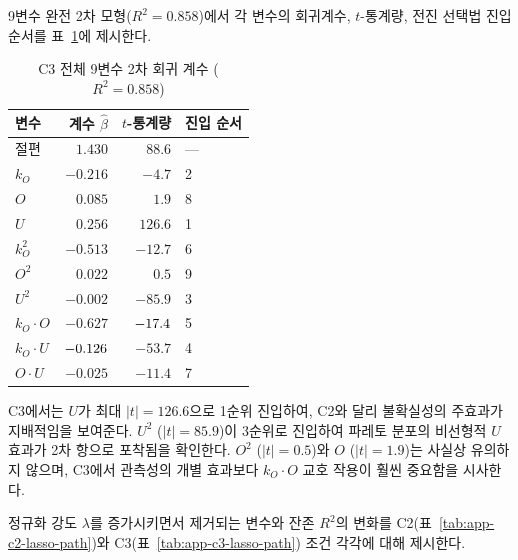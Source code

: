  9변수 완전 2차 모형($R^2 = 0.858$)에서 각 변수의 회귀계수,
$t$-통계량, 전진 선택법 진입 순서를 \p{[}표~\ref{tab:app-c3-full-quad}\p{]}에 제시한다.

\begin{table}[htbp]
\centering
\caption{C3 전체 9변수 2차 회귀 계수 ($R^2 = 0.858$)}
\label{tab:app-c3-full-quad}
\small
\begin{tabular}{lrrl}
\toprule
\textbf{변수} & \textbf{계수 $\hat{\beta}$} & \textbf{$t$-통계량} & \textbf{진입 순서} \\
\midrule
절편 & $1.430$ & $88.6$ & --- \\
$k_O$ & $-0.216$ & $-4.7$ & 2 \\
$O$ & $0.085$ & $1.9$ & 8 \\
$U$ & $0.256$ & $126.6$ & 1 \\
$k_O^2$ & $-0.513$ & $-12.7$ & 6 \\
$O^2$ & $0.022$ & $0.5$ & 9 \\
$U^2$ & $-0.002$ & $-85.9$ & 3 \\
$k_O \cdot O$ & $-0.627$ & $\erf{-17.4}{-17.3}$ & 5 \\
$k_O \cdot U$ & $\erf{-0.126}{-0.125}$ & $-53.7$ & 4 \\
$O \cdot U$ & $-0.025$ & $-11.4$ & 7 \\
\bottomrule
\end{tabular}
\end{table}

C3에서는 $U$가 최대 $|t| = 126.6$으로 1순위 진입하여,
C2와 달리 불확실성의 주효과가 지배적임을 보여준다.
$U^2$ ($|t| = 85.9$)이 3순위로 진입하여 파레토 분포의
비선형적 $U$ 효과가 2차 항으로 포착됨을 확인한다.
$O^2$ ($|t| = 0.5$)와 $O$ ($|t| = 1.9$)는 사실상 유의하지 않으며,
C3에서 관측성의 개별 효과보다 $k_O \cdot O$ 교호 작용이
훨씬 중요함을 시사한다.


 정규화 강도 $\lambda$를 증가시키면서 제거되는 변수와 잔존 $R^2$의 변화를
C2(\p{[}표~\ref{tab:app-c2-lasso-path}\p{]})와 C3(\p{[}표~\ref{tab:app-c3-lasso-path}\p{]}) 조건 각각에 대해 제시한다.

